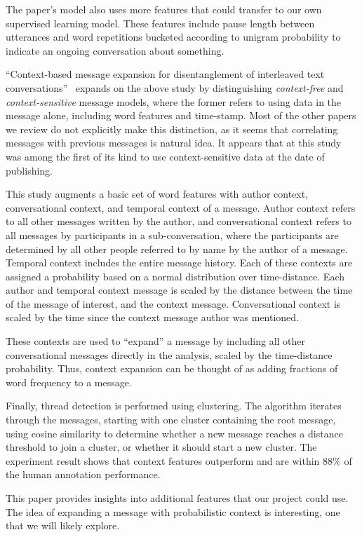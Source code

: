 \documentclass[11pt]{article}
\newcommand{\titlecite}[2]{``#1''~\cite{#2}}
\begin{document}
The paper's model also uses more features that could transfer to
our own supervised learning model. These features include pause length
between utterances and word repetitions bucketed according to unigram
probability to indicate an ongoing conversation about something.

\titlecite{Context-based message expansion for disentanglement of interleaved 
text conversations}{Wang2009b} expands on the above study by distinguishing
\textit{context-free} and \textit{context-sensitive} message models, where the 
former refers to using data in the message alone, including word features and 
time-stamp. Most of the other papers we review do not explicitly make this 
distinction, as it seems that correlating messages with previous messages is 
natural idea. It appears that at this study was among the first of its 
kind to use context-sensitive data at the date of publishing.

This study augments a basic set of word features with author context, 
conversational context, and temporal context of a message. Author context 
refers to all other messages written by the author, and conversational context 
refers to all messages by participants in a sub-conversation, 
where the participants are determined by all other people referred to by name 
by the author of a message. Temporal context includes the entire message 
history. Each of these contexts are assigned a probability based on a normal 
distribution over time-distance. Each author and temporal context message is 
scaled by the distance between the time of the message of interest, and the 
context message. Conversational context is scaled by the time since the 
context message author was mentioned.

These contexts are used to ``expand'' a message by including all other 
conversational messages directly in the analysis, scaled by the time-distance 
probability. Thus, context expansion can be thought of as adding fractions of 
word frequency to a message.

Finally, thread detection is performed using clustering. The algorithm iterates 
through the messages, starting with one cluster containing the root message, 
using cosine similarity to determine whether a new message reaches a distance 
threshold to join a cluster, or whether it should start a new cluster. The 
experiment result shows that context features outperform \cite{Elsner2008a} and
are within 88\% of the human annotation performance.

This paper provides insights into additional features that our project could 
use. The idea of expanding a message with probabilistic context is 
interesting, one that we will likely explore.
\end{document}
